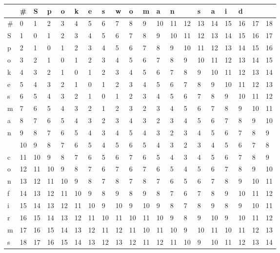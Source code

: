 \begin{tabular}{llllllllllllllllllll}
\toprule
{} &   \# &   S &   p &   o &   k &   e &   s &   w &   o &   m &   a & \multicolumn{2}{l}{n} &   s &   a &   i & \multicolumn{3}{l}{d} \\
\midrule
\# &   0 &   1 &   2 &   3 &   4 &   5 &   6 &   7 &   8 &   9 &  10 &  11 &  12 &  13 &  14 &  15 &  16 &  17 &  18 \\
S &   1 &   0 &   1 &   2 &   3 &   4 &   5 &   6 &   7 &   8 &   9 &  10 &  11 &  12 &  13 &  14 &  15 &  16 &  17 \\
p &   2 &   1 &   0 &   1 &   2 &   3 &   4 &   5 &   6 &   7 &   8 &   9 &  10 &  11 &  12 &  13 &  14 &  15 &  16 \\
o &   3 &   2 &   1 &   0 &   1 &   2 &   3 &   4 &   5 &   6 &   7 &   8 &   9 &  10 &  11 &  12 &  13 &  14 &  15 \\
k &   4 &   3 &   2 &   1 &   0 &   1 &   2 &   3 &   4 &   5 &   6 &   7 &   8 &   9 &  10 &  11 &  12 &  13 &  14 \\
e &   5 &   4 &   3 &   2 &   1 &   0 &   1 &   2 &   3 &   4 &   5 &   6 &   7 &   8 &   9 &  10 &  11 &  12 &  13 \\
s &   6 &   5 &   4 &   3 &   2 &   1 &   0 &   1 &   2 &   3 &   4 &   5 &   6 &   7 &   8 &   9 &  10 &  11 &  12 \\
m &   7 &   6 &   5 &   4 &   3 &   2 &   1 &   2 &   3 &   2 &   3 &   4 &   5 &   6 &   7 &   8 &   9 &  10 &  11 \\
a &   8 &   7 &   6 &   5 &   4 &   3 &   2 &   3 &   4 &   3 &   2 &   3 &   4 &   5 &   6 &   7 &   8 &   9 &  10 \\
n &   9 &   8 &   7 &   6 &   5 &   4 &   3 &   4 &   5 &   4 &   3 &   2 &   3 &   4 &   5 &   6 &   7 &   8 &   9 \\
  &  10 &   9 &   8 &   7 &   6 &   5 &   4 &   5 &   6 &   5 &   4 &   3 &   2 &   3 &   4 &   5 &   6 &   7 &   8 \\
c &  11 &  10 &   9 &   8 &   7 &   6 &   5 &   6 &   7 &   6 &   5 &   4 &   3 &   4 &   5 &   6 &   7 &   8 &   9 \\
o &  12 &  11 &  10 &   9 &   8 &   7 &   6 &   7 &   6 &   7 &   6 &   5 &   4 &   5 &   6 &   7 &   8 &   9 &  10 \\
n &  13 &  12 &  11 &  10 &   9 &   8 &   7 &   8 &   7 &   8 &   7 &   6 &   5 &   6 &   7 &   8 &   9 &  10 &  11 \\
f &  14 &  13 &  12 &  11 &  10 &   9 &   8 &   9 &   8 &   9 &   8 &   7 &   6 &   7 &   8 &   9 &  10 &  11 &  12 \\
i &  15 &  14 &  13 &  12 &  11 &  10 &   9 &  10 &   9 &  10 &   9 &   8 &   7 &   8 &   9 &   8 &   9 &  10 &  11 \\
r &  16 &  15 &  14 &  13 &  12 &  11 &  10 &  11 &  10 &  11 &  10 &   9 &   8 &   9 &  10 &   9 &  10 &  11 &  12 \\
m &  17 &  16 &  15 &  14 &  13 &  12 &  11 &  12 &  11 &  10 &  11 &  10 &   9 &  10 &  11 &  10 &  11 &  12 &  13 \\
s &  18 &  17 &  16 &  15 &  14 &  13 &  12 &  13 &  12 &  11 &  12 &  11 &  10 &   9 &  10 &  11 &  12 &  13 &  14 \\
\bottomrule
\end{tabular}
